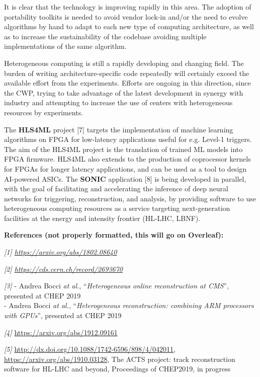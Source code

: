 \documentclass[11pt,a4paper]{article}
\begin{document}
It is clear that the technology is improving rapidly in this area. The
adoption of portability toolkits is needed to avoid vendor lock-in
and/or the need to evolve algorithms by hand to adapt to each new type
of computing architecture, as well as to increase the sustainability of
the codebase avoiding multiple implementations of the same algorithm.

Heterogeneous computing is still a rapidly developing and changing
field. The burden of writing architecture-specific code repeatedly will
certainly exceed the available effort from the experiments. Efforts are
ongoing in this direction, since the CWP, trying to take advantage of
the latest development in synergy with industry and attempting to
increase the use of centers with heterogeneous resources by experiments.

The \textbf{HLS4ML} project {[}7{]} targets the implementation of
machine learning algorithms on FPGA for low-latency applications useful
for e.g. Level-1 triggers. The aim of the HLS4ML project is the
translation of trained ML models into FPGA firmware. HLS4ML also extends
to the production of coprocessor kernels for FPGAs for longer latency
applications, and can be used as a tool to design AI-powered ASICs. The
\textbf{SONIC} application {[}8{]} is being developed in parallel, with
the goal of facilitating and accelerating the inference of deep neural
networks for triggering, reconstruction, and analysis, by providing
software to use heterogeneous computing resources as a service targeting
next-generation facilities at the energy and intensity frontier (HL-LHC,
LBNF).

\textbf{References (not properly formatted, this will go on Overleaf):}

\emph{{[}1{]}
\href{https://arxiv.org/abs/1802.08640}{{https://arxiv.org/abs/1802.08640}}}

\emph{{[}2{]}
\href{https://cds.cern.ch/record/2693670}{{https://cds.cern.ch/record/2693670}}}

\emph{{[}3{]}} - Andrea Bocci \emph{at al.}, ``\emph{Heterogeneous
online reconstruction at CMS}'', presented at CHEP 2019\\
- Andrea Bocci \emph{at al.}, ``\emph{Heterogeneous reconstruction:
combining ARM processors with GPUs}'', presented at CHEP 2019

\emph{{[}4{]}}
\href{https://arxiv.org/abs/1912.09161}{{https://arxiv.org/abs/1912.09161}}

\emph{{[}5{]}}
\href{http://dx.doi.org/10.1088/1742-6596/898/4/042011}{{http://dx.doi.org/10.1088/1742-6596/898/4/042011}},
\href{https://arxiv.org/abs/1910.03128}{{https://arxiv.org/abs/1910.03128}},
The ACTS project: track reconstruction software for HL-LHC and beyond,
Proceedings of CHEP2019, in progress
\end{document}
